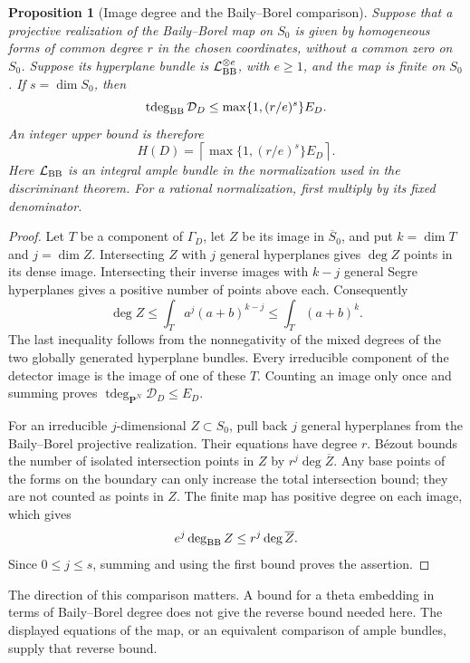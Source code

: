 \documentclass[11pt]{article}
\newtheorem{proposition}[theorem]{Proposition}
\theoremstyle{definition}
\theoremstyle{remark}
\begin{document}
\begin{proposition}[Image degree and the Baily--Borel comparison]
\label{prop:degree-certificate}
Suppose that a projective realization of the Baily--Borel map on
$S_0$ is given by homogeneous forms of common degree $r$ in the
chosen coordinates, without a common zero on $S_0$.  Suppose its
hyperplane bundle is $\mathcal L_{\rm BB}^{\otimes e}$, with
$e\geq1$, and the map is finite on $S_0$.  If $s=\dim S_0$, then
\[
 \operatorname{tdeg}_{\rm BB}\mathcal D_D
 \leq\max\{1,(r/e)^s\}E_D.
\]
An integer upper bound is therefore
\[
 H(D)=\left\lceil\max\{1,(r/e)^s\}E_D\right\rceil.
\]
Here $\mathcal L_{\rm BB}$ is an integral ample bundle in the
normalization used in the discriminant theorem.  For a rational
normalization, first multiply by its fixed denominator.
\end{proposition}

\begin{proof}
Let $T$ be a component of $\Gamma_D$, let $Z$ be its image in
$\overline S_0$, and put $k=\dim T$ and $j=\dim Z$.
Intersecting $Z$ with $j$ general hyperplanes gives $\deg Z$
points in its dense image.  Intersecting their inverse images with
$k-j$ general Segre hyperplanes gives a positive number of points
above each.  Consequently
\[
 \deg Z\leq\int_T a^j(a+b)^{k-j}
            \leq\int_T(a+b)^k.
\]
The last inequality follows from the nonnegativity of the mixed
degrees of the two globally generated hyperplane bundles.
Every irreducible component of the detector image is the image of
one of these $T$.  Counting an image only once and summing proves
$\operatorname{tdeg}_{\mathbf P^N}\mathcal D_D\leq E_D$.

For an irreducible $j$-dimensional $Z\subset S_0$, pull back $j$
general hyperplanes from the Baily--Borel projective realization.
Their equations have degree $r$.  B\'ezout bounds the number of
isolated intersection points in $Z$ by $r^j\deg\overline Z$.
Any base points of the forms on the boundary can only increase the
total intersection bound; they are not counted as points in $Z$.
The finite map has positive degree on each image, which gives
\[
 e^j\deg_{\rm BB}Z\leq r^j\deg\overline Z.
\]
Since $0\leq j\leq s$, summing and using the first bound proves
the assertion.
\end{proof}

The direction of this comparison matters.  A bound for a theta
embedding in terms of Baily--Borel degree does not give the reverse
bound needed here.  The displayed equations of the map, or an
equivalent comparison of ample bundles, supply that reverse bound.
\end{document}
